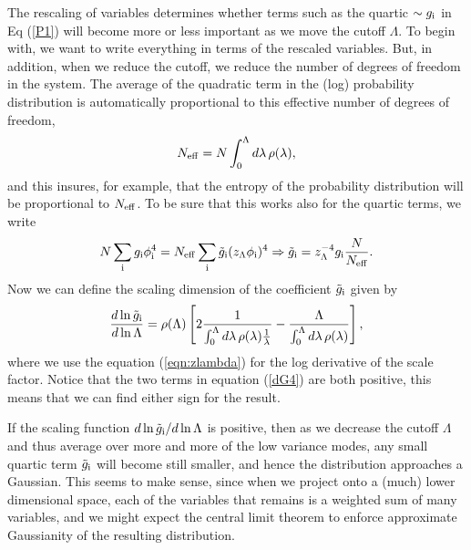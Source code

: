 \documentclass[aps,twocolumn,floats,nofootinbib,prl]{revtex4}
\begin{document}
The rescaling of variables determines whether terms such as the quartic $\sim g_{\rm i}$ in Eq (\ref{P1}) will become more or less important as we move the cutoff $\Lambda$.  To begin with, we want to write everything in terms of the rescaled variables.  But, in addition,
when we reduce the cutoff, we reduce the number of degrees of freedom in the system.  The average of the quadratic term in the (log) probability distribution is automatically proportional to this effective number of degrees of freedom, \begin{equation}
N_{\rm eff} = N\int_0^\Lambda d\lambda \,\rho(\lambda ),
\end{equation}
and this insures, for example, that the entropy of the probability distribution will be proportional to $N_{\rm eff}$. 
To be sure that this works also for the quartic terms, we write
\begin{eqnarray}
N \sum_{\rm i} g_{\rm i} \phi_{\rm i}^4  = N_{\rm eff} \sum_{\rm i} \tilde g_{\rm i}(z_\Lambda \phi_{\rm i})^4 \Rightarrow
 \tilde g_{\rm i} = z_{\Lambda}^{-4} g_{\rm i} \frac{N}{N_{\rm eff}} .
\end{eqnarray}
Now we can define the scaling dimension of the coefficient $\tilde g_{\rm i}$ given by
\begin{equation}
\frac{d\ln \tilde g_{\rm i} }{d\ln\Lambda} = \rho(\Lambda) \left[  2 \frac{1}{\int_0^\Lambda d\lambda\, \rho(\lambda ) \frac{1}{\lambda}} - \frac{\Lambda}{\int_0^\Lambda d\lambda \,\rho(\lambda )} \right] ,
\label{dG4}
\end{equation}
where we use the equation (\ref{eqn:zlambda}) for the log derivative of the scale factor. Notice that the two terms in equation (\ref{dG4}) are both positive, this means that we can find either sign for the result.  

If the scaling function ${d\ln \tilde g_{\rm i} }/{d\ln\Lambda}$ is positive, then as we decrease the cutoff $\Lambda$  and thus average over more and more of the low variance modes, any small quartic term $\tilde g_{\rm i}$ will become still smaller, and hence the distribution approaches a Gaussian.  This seems to make sense, since when we project onto a (much) lower dimensional space, each of the variables that remains is a weighted sum of many variables, and we might expect the central limit theorem to enforce approximate Gaussianity of the resulting distribution.  
\end{document}
